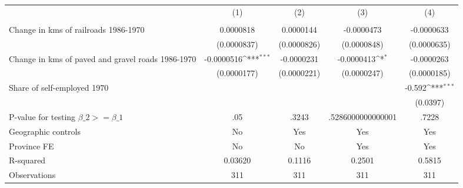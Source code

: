 {
\def\sym#1{\ifmmode^{#1}\else\(^{#1}\)\fi}
\begin{tabular}{l*{4}{c}}
\hline\hline
                &\multicolumn{1}{c}{(1)}&\multicolumn{1}{c}{(2)}&\multicolumn{1}{c}{(3)}&\multicolumn{1}{c}{(4)}\\
                &\multicolumn{1}{c}{}&\multicolumn{1}{c}{}&\multicolumn{1}{c}{}&\multicolumn{1}{c}{}\\
\hline
Change in kms of railroads 1986-1970&0.0000818         &0.0000144         &-0.0000473         &-0.0000633         \\
                &(0.0000837)         &(0.0000826)         &(0.0000848)         &(0.0000635)         \\
[1em]
Change in kms of paved and gravel roads 1986-1970&-0.0000516\sym{***}&-0.0000231         &-0.0000413\sym{*}  &-0.0000263         \\
                &(0.0000177)         &(0.0000221)         &(0.0000247)         &(0.0000185)         \\
[1em]
Share of self-employed 1970&                  &                  &                  &   -0.592\sym{***}\\
                &                  &                  &                  & (0.0397)         \\
\hline
P-value for testing $\beta\_{2} >= \beta\_{1}$&      .05         &    .3243         &.5286000000000001         &    .7228         \\
Geographic controls&       No         &      Yes         &      Yes         &      Yes         \\
Province FE     &       No         &       No         &      Yes         &      Yes         \\
R-squared       &  0.03620         &   0.1116         &   0.2501         &   0.5815         \\
Observations    &      311         &      311         &      311         &      311         \\
\hline\hline
\end{tabular}
}
